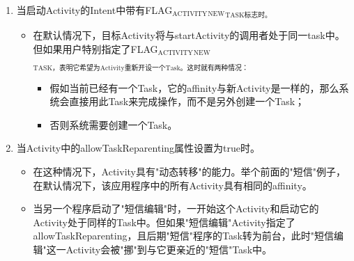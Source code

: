 \documentclass[9pt, b5paaper]{book}
\begin{document}
\begin{enumerate}
\begin{enumerate}
\item 当启动Activity的Intent中带有FLAG$_{\text{ACTIVITY}}$$_{\text{NEW}}$$_{\text{TASK标志时。}}$
\label{sec-4-9-2-3-1}
\begin{itemize}
\item 在默认情况下，目标Activity将与startActivity的调用者处于同一task中。但如果用户特别指定了FLAG$_{\text{ACTIVITY}}$$_{\text{NEW}}$$_{\text{TASK，表明它希望为Activity重新开设一个Task。这时就有两种情况：}}$
\begin{itemize}
\item 假如当前已经有一个Task，它的affinity与新Activity是一样的，那么系统会直接用此Task来完成操作，而不是另外创建一个Task；
\item 否则系统需要创建一个Task。
\end{itemize}
\end{itemize}
\item 当Activity中的allowTaskReparenting属性设置为true时。
\label{sec-4-9-2-3-2}
\begin{itemize}
\item 在这种情况下，Activity具有"动态转移"的能力。举个前面的"短信"例子，在默认情况下，该应用程序中的所有Activity具有相同的affinity。
\item 当另一个程序启动了"短信编辑"时，一开始这个Activity和启动它的Activity处于同样的Task中。但如果"短信编辑"Activity指定了allowTaskReparenting，且后期"短信"程序的Task转为前台，此时"短信编辑"这一Activity会被"挪"到与它更亲近的"短信"Task中。
\end{itemize}
\end{enumerate}
\end{enumerate}
\end{document}
